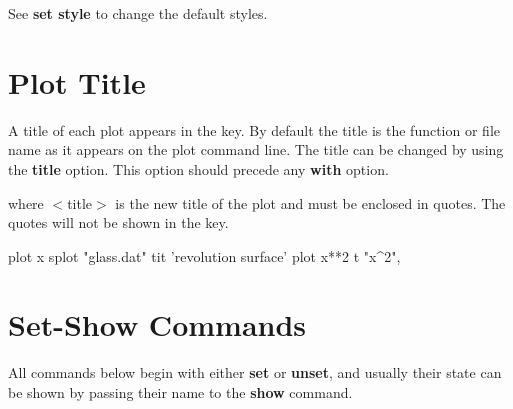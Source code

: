 See {\bf set style} to change the default styles.

\section{Plot Title}

A title of each plot appears in the key. By default the title is
the function or file name as it appears on the plot command line.
The title can be changed by using the {\bf title} option. This option
should precede any {\bf with} option.


where $<$title$>$ is the new title of the plot and must be enclosed in
quotes. The quotes will not be shown in the key.

 {plot x}
{splot "glass.dat" tit 'revolution surface'}
    {plot x**2 t "x^2", \\}

\section{Set-Show Commands}

All commands below begin with either {\bf set} or {\bf unset}, and
usually their state can be shown by passing their name to the {\bf
  show} command.

